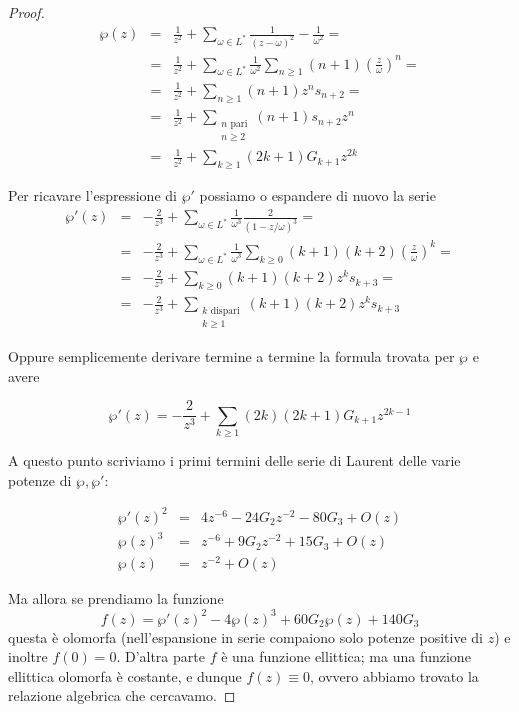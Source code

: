 \begin{proof}
    \begin{eqnarray*}
    \wp(z) & = & \frac{1}{z^2} + \sum_{\omega \in L^*} \frac1{(z-\omega)^2}-\frac1{\omega^2} = \\
           & = & \frac{1}{z^2} + \sum_{\omega \in L^*} \frac{1}{\omega^2} \sum_{n \ge 1} (n+1) \left ( \frac{z}{\omega} \right ) ^n =  \\
           & = & \frac{1}{z^2} + \sum_{n \ge 1} (n+1) z^n s_{n+2} = \\
           & = & \frac{1}{z^2} + \sum_{\substack{n \text{ pari} \\ n \ge 2}} (n+1)s_{n+2} z^n \\
           & = & \frac{1}{z^2} + \sum_{k\ge1} (2k+1)G_{k+1} z^{2k}
    \end{eqnarray*}

    Per ricavare l'espressione di $\wp'$ possiamo o espandere di nuovo la serie
    \begin{eqnarray*}
    \wp'(z)& = & -\frac{2}{z^3}+ \sum_{\omega \in L^*} \frac{1}{\omega^3} \frac{2}{(1-z/\omega)^3}= \\
           & = & -\frac{2}{z^3}+ \sum_{\omega \in L^*} \frac{1}{\omega^3} \sum_{k \ge 0} (k+1)(k+2) \left ( \frac{z}{\omega} \right ) ^k =\\
           & = & -\frac{2}{z^3} + \sum_{k \ge 0} (k+1)(k+2) z^k s_{k+3} =\\
           & = & -\frac{2}{z^3} + \sum_{\substack{k \text{ dispari} \\ k \ge 1}} (k+1)(k+2) z^k s_{k+3}
    \end{eqnarray*}

    Oppure semplicemente derivare termine a termine la formula trovata per $\wp$ e avere

    $$ \wp'(z) = -\frac{2}{z^3}+\sum_{k\ge1}(2k)(2k+1)G_{k+1}z^{2k-1}$$


    A questo punto scriviamo i primi termini delle serie di Laurent delle varie potenze di $\wp,\wp'$:

    \begin{eqnarray*}
    \wp'(z)^2& = & 4z^{-6}-24G_2z^{-2}-80G_3+O(z) \\
    \wp(z)^3 & = & z^{-6}+9G_2z^{-2}+15G_3+O(z)  \\
    \wp(z) & = & z^{-2}+O(z)
    \end{eqnarray*}

    Ma allora se prendiamo la funzione $$ f(z)= \wp'(z)^2 -4\wp(z)^3+60G_2\wp(z)+140G_3 $$
    questa è olomorfa (nell'espansione in serie compaiono solo potenze positive di $z$) e inoltre $f(0)=0$.
    D'altra parte $f$ è una funzione ellittica; ma una funzione ellittica olomorfa è costante, e dunque $f(z)\equiv 0$, ovvero abbiamo trovato la relazione algebrica che cercavamo.

\end{proof}
